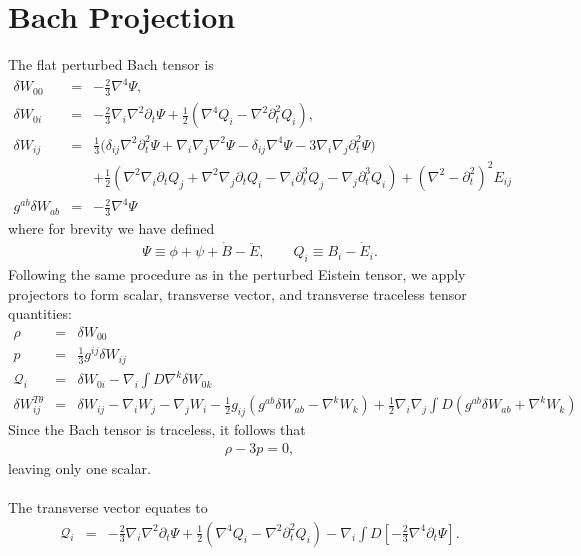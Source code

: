 \documentclass[10pt,letterpaper]{article}
\numberwithin{equation}{section}
\begin{document}
\section{Bach Projection}
%
%
The flat perturbed Bach tensor is
\begin{eqnarray}
\delta W_{00}  &=& -\tfrac{2}{3}\nabla^4 \Psi,
\nonumber\\	
\delta W_{0i} &=&  -\tfrac{2}{3}\nabla_i\nabla^2 \partial_t\Psi
+\tfrac{1}{2}\left(\nabla^4 Q_i -  \nabla^2 \partial_t^2 Q_i \right),
\nonumber\\	
\delta W_{ij}  &=& \tfrac{1}{3}\bigg( \delta_{ij}\nabla^2 \partial_t^2\Psi + \nabla_i\nabla_j\nabla^2 \Psi
- \delta_{ij}\nabla^4 \Psi -3\nabla_i\nabla_j \partial_t^2 \Psi \bigg)
\nonumber\\
&& +\tfrac{1}{2}\left( \nabla^2\nabla_i   \partial_t Q_j+ \nabla^2 \nabla_j \partial_t Q_i - \nabla_i\partial_t^3 Q_j-\nabla_j\partial_t^3 Q_i \right)
 +\left(\nabla^2-\partial_t^2\right)^2E_{ij}
\nonumber\\
g^{ab}\delta W_{ab}&=& -\tfrac23 \nabla^4 \Psi
\end{eqnarray}
where for brevity we have defined
\begin{eqnarray}
\Psi \equiv \phi + \psi +\dot{B}-\ddot{E},\qquad Q_i \equiv B_i - \dot{E}_i.
\end{eqnarray}
Following the same procedure as in the perturbed Eistein tensor, we apply projectors to form scalar, transverse vector, and transverse traceless tensor quantities:
\begin{eqnarray}
\rho &=& \delta W_{00}
\label{rhow}\\
p &=& \tfrac13 g^{ij} \delta W_{ij}
\label{pw}\\
\mathcal Q_i &=& \delta W_{0i}-\nabla_i \int D \nabla^k \delta W_{0k}
\label{Qiw}\\
\delta W_{ij}^{T\theta} &=& \delta W_{ij} - \nabla_i W_j - \nabla_j W_i - \frac12 g_{ij}(g^{ab}\delta W_{ab}-\nabla^k W_k) + \frac12 \nabla_i \nabla_j \int D(g^{ab}\delta W_{ab}+\nabla^k W_k)
\label{dwtt}
\end{eqnarray}
Since the Bach tensor is traceless, it follows that 
\begin{eqnarray}
\rho - 3p = 0,
\end{eqnarray}
leaving only one scalar.
\\ \\
The transverse vector equates to
\begin{eqnarray}
 \mathcal Q_i &=& -\tfrac{2}{3}\nabla_i\nabla^2 \partial_t\Psi
+\tfrac{1}{2}\left(\nabla^4 Q_i -  \nabla^2 \partial_t^2 Q_i \right)
-\nabla_i \int D\left[ -\tfrac{2}{3}\nabla^4 \partial_t\Psi \right].
\end{eqnarray}
\end{document}
